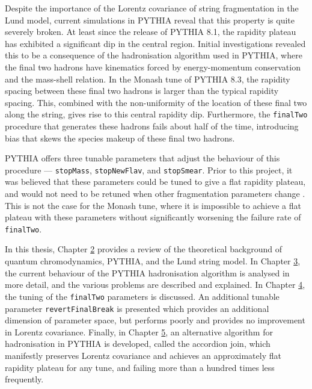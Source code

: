 \documentclass[12pt,a4paper]{report}
\begin{document}
Despite the importance of the Lorentz covariance of string fragmentation in the Lund model, current simulations in PYTHIA reveal that this property is quite severely broken. At least since the release of PYTHIA 8.1, the rapidity plateau has exhibited a significant dip in the central region. Initial investigations revealed this to be a consequence of the hadronisation algorithm used in PYTHIA, where the final two hadrons have kinematics forced by energy-momentum conservation and the mass-shell relation. In the Monash tune of PYTHIA 8.3, the rapidity spacing between these final two hadrons is larger than the typical rapidity spacing. This, combined with the non-uniformity of the location of these final two along the string, gives rise to this central rapidity dip. Furthermore, the \texttt{finalTwo} procedure that generates these hadrons fails about half of the time, introducing bias that skews the species makeup of these final two hadrons.

PYTHIA offers three tunable parameters that adjust the behaviour of this procedure --- \texttt{stopMass}, \texttt{stopNewFlav}, and \texttt{stopSmear}. Prior to this project, it was believed that these parameters could be tuned to give a flat rapidity plateau, and would not need to be retuned when other fragmentation parameters change \cite{Bierlich:2022pfr,Sjostrand:2006za}. This is not the case for the Monash tune, where it is impossible to achieve a flat plateau with these parameters without significantly worsening the failure rate of \texttt{finalTwo}.

In this thesis, Chapter \hyperref[chap:background]{2} provides a review of the theoretical background of quantum chromodynamics, PYTHIA, and the Lund string model. In Chapter \hyperref[chap:fragmentation]{3}, the current behaviour of the PYTHIA hadronisation algorithm is analysed in more detail, and the various problems are described and explained. In Chapter \hyperref[chap:tuning]{4}, the tuning of the \texttt{finalTwo} parameters is discussed. An additional tunable parameter \texttt{revertFinalBreak} is presented which provides an additional dimension of parameter space, but performs poorly and provides no improvement in Lorentz covariance. Finally, in Chapter \hyperref[chap:accordion]{5}, an alternative algorithm for hadronisation in PYTHIA is developed, called the accordion join, which manifestly preserves Lorentz covariance and achieves an approximately flat rapidity plateau for any tune, and failing more than a hundred times less frequently.
\end{document}
